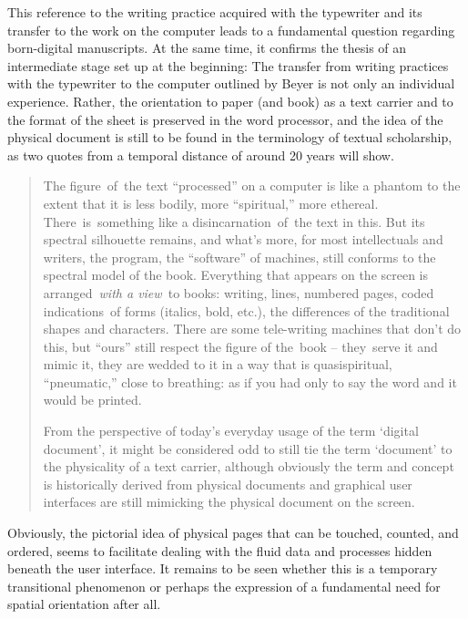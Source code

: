 \documentclass{article}
\begin{document}
This reference to the writing practice acquired with the typewriter and
its transfer to the work on the computer leads to a fundamental question
regarding born-digital manuscripts. At the same time, it confirms the
thesis of an intermediate stage set up at the beginning: The transfer
from writing practices with the typewriter to the computer outlined by
Beyer is not only an individual experience. Rather, the orientation to
paper (and book) as a text carrier and to the format of the sheet is
preserved in the word processor, and the idea of the physical document
is still to be found in the terminology of textual scholarship, as two
quotes from a temporal distance of around 20 years will show.

\begin{quote}
The figure~of~the text ``processed'' on a computer is like a phantom to
the extent that it is less bodily, more ``spiritual,'' more ethereal.
There~is~something like a disincarnation~of~the text in this. But its
spectral silhouette remains, and what's more, for most intellectuals and
writers, the program, the ``software'' of machines, still conforms to
the spectral model of the book. Everything that appears on the screen is
arranged~\emph{with a view~}to books: writing, lines, numbered pages,
coded indications~of forms (italics, bold, etc.), the differences of the
traditional shapes and characters. There are some tele-writing machines
that don't do this, but ``ours'' still respect the figure of the~book --
they~serve it and mimic it, they are wedded to it in a way that is
quasispiritual, ``pneumatic,'' close to breathing: as if you had only to
say the word and it would be printed.~
\begin{flushright}
    \parencite[30]{derrida_paper_2005}
\end{flushright} 

From the perspective of today's everyday usage of the term `digital
document', it might be considered odd to still tie the term `document'
to the physicality of a text carrier, although obviously the term and
concept is historically derived from physical documents and graphical
user interfaces are still mimicking the physical document on the screen.
\begin{flushright}
    \parencite[146]{ries_philology_2017}
\end{flushright} 
\end{quote}

Obviously, the pictorial idea of physical pages that can be touched,
counted, and ordered, seems to facilitate dealing with the fluid data and
processes hidden beneath the user interface. It remains to be seen
whether this is a temporary transitional phenomenon or perhaps the
expression of a fundamental need for spatial orientation after all.
\end{document}
